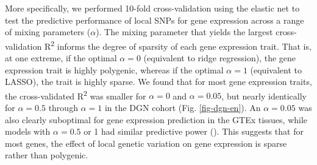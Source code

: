 \documentclass[10pt,letterpaper]{article}
\begin{document}
More specifically, we performed 10-fold cross-validation using the elastic net \cite{Zou_2005} to test the predictive performance of local SNPs for gene expression across a range of mixing parameters ($\alpha$). The mixing parameter that yields the largest cross-validation R\textsuperscript{2} informs the degree of sparsity of each gene expression trait. That is, at one extreme, if the optimal \(\alpha=0\) (equivalent to ridge regression), the gene expression trait is highly polygenic, whereas if the optimal \(\alpha=1\) (equivalent to LASSO), the trait is highly sparse. We found that for most gene expression traits, the cross-validated R\textsuperscript{2} was smaller for \(\alpha=0\) and \(\alpha=0.05\), but nearly identically for \(\alpha=0.5\) through \(\alpha=1\) in the DGN cohort (Fig. \ref{fig-dgn-en}). An \(\alpha=0.05\) was also clearly suboptimal for gene expression prediction in the GTEx tissues, while models with \(\alpha=0.5\) or 1 had similar predictive power (). This suggests that for most genes, the effect of local genetic variation on gene expression is sparse rather than polygenic.
\end{document}
